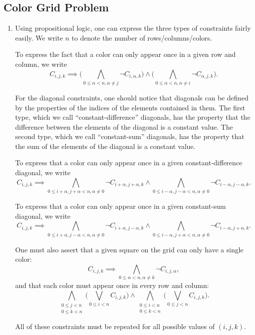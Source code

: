 \documentclass[journal,onecolumn]{IEEEtran}
\begin{document}
\subsection{Color Grid Problem}
\begin{enumerate}
	\item Using propositional logic, one can express the three types of constraints fairly easily.
	We write \(n\) to denote the number of rows/columns/colors.
	
	To express the fact that a color can only appear once in a given row and column, we write
	\[
	C_{i, j, k} \implies \Bigg(\bigwedge_{0 \le \alpha < n, \alpha \ne j} \lnot C_{i, \alpha, k}\Bigg) \land \Bigg(\bigwedge_{0 \le \alpha < n, \alpha \ne i} \lnot C_{\alpha, j, k}\Bigg).
	\]
	
	For the diagonal constraints, one should notice that diagonals can be defined by the properties of the indices of the elements contained in them.
	The first type, which we call ``constant-difference'' diagonals, has the property that the difference between the elements of the diagonal is a constant value.
	The second type, which we call ``constant-sum'' diagonals, has the property that the sum of the elements of the diagonal is a constant value.
	
	To express that a color can only appear once in a given constant-difference diagonal, we write
	\[
	C_{i, j, k} \implies \bigwedge_{0 \le i+\alpha, j+\alpha < n, \alpha \ne 0} \lnot C_{i+\alpha, j+\alpha, k} \land \bigwedge_{0 \le i-\alpha, j-\alpha < n, \alpha 
	\ne 0} \lnot C_{i-\alpha, j-\alpha, k}.
	\]
	
	To express that a color can only appear once in a given constant-sum diagonal, we write
	\[
	C_{i, j, k} \implies \bigwedge_{0 \le i+\alpha, j-\alpha < n, \alpha \ne 0} \lnot C_{i+\alpha, j-\alpha, k} \land \bigwedge_{0 \le i-\alpha, j+\alpha < n, \alpha \ne 0} \lnot C_{i-\alpha, j+\alpha, k}.
	\]
	
	One must also assert that a given square on the grid can only have a single color:
	\[
	C_{i, j, k} \implies \bigwedge_{0 \le \alpha < n, \alpha \ne k} \lnot C_{i, j, \alpha},
	\]
	and that each color must appear once in every row and column:
	\[
	\bigwedge_{\substack{0 \le j < n \\ 0 \le k < n}} \Bigg(\bigvee_{0 \le i < n} C_{i, j, k}\Bigg) \land \bigwedge_{\substack{0 \le i < n \\ 0 \le k < n}} \Bigg(\bigvee_{0 \le j < n} C_{i, j, k}\Bigg).
	\]
	
	All of these constraints must be repeated for all possible values of \((i, j, k)\).
	

\end{enumerate}
\end{document}

